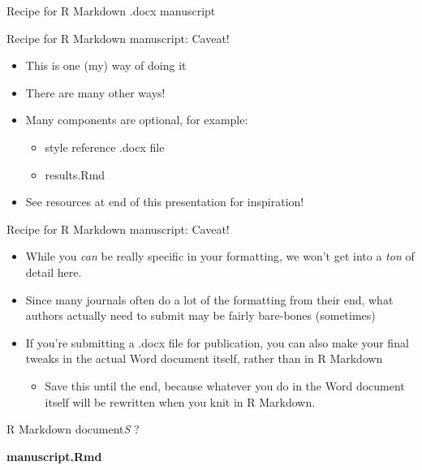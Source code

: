 \documentclass[
  ignorenonframetext,
]{beamer}
\providecommand{\tightlist}{%
  \setlength{\itemsep}{0pt}\setlength{\parskip}{0pt}}
\begin{document}
\begin{frame}[fragile]
\begin{block}{Recipe for R Markdown .docx manuscript}
\end{block}

\begin{block}{Recipe for R Markdown manuscript: Caveat!}

\begin{itemize}
\tightlist
\item
  This is one (my) way of doing it
\item
  There are many other ways!
\item
  Many components are optional, for example:

  \begin{itemize}
  \tightlist
  \item
    style reference .docx file
  \item
    results.Rmd
  \end{itemize}
\item
  See resources at end of this presentation for inspiration!
\end{itemize}

\end{block}

\begin{block}{Recipe for R Markdown manuscript: Caveat!}

\begin{itemize}
\tightlist
\item
  While you \emph{can} be really specific in your formatting, we won't
  get into a \emph{ton} of detail here.
\item
  Since many journals often do a lot of the formatting from their end,
  what authors actually need to submit may be fairly bare-bones
  (sometimes)
\item
  If you're submitting a .docx file for publication, you can also make
  your final tweaks in the actual Word document itself, rather than in R
  Markdown

  \begin{itemize}
  \tightlist
  \item
    Save this until the end, because whatever you do in the Word
    document itself will be rewritten when you knit in R Markdown.
  \end{itemize}
\end{itemize}

\end{block}

\begin{block}{R Markdown document\emph{S} ?}

\textbf{manuscript.Rmd}


\end{block}
\end{frame}
\end{document}
